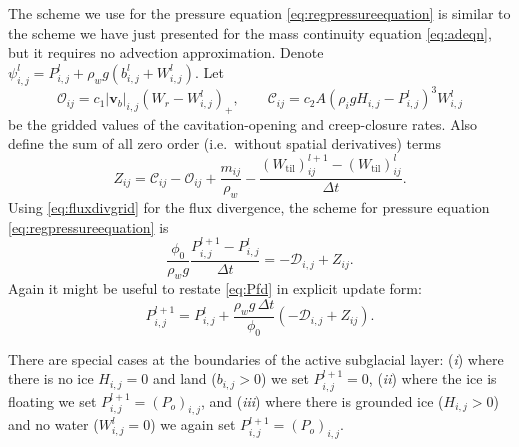 \documentclass[11pt,final]{amsart}
\newcommand\bv{\mathbf{v}}
\newcommand{\Wtil}{W_{\text{til}}}
\newcommand{\Wlij}{W^l_{i,j}}
\newcommand{\Plij}{P^l_{i,j}}
\begin{document}
The scheme we use for the pressure equation \eqref{eq:regpressureequation} is similar to the scheme we have just presented for the mass continuity equation \eqref{eq:adeqn}, but it requires no advection approximation.  Denote $\psi_{i,j}^l = P_{i,j}^l + \rho_w g (b_{i,j}^l + W_{i,j}^l)$.  Let
	$$\mathcal{O}_{ij} = c_1 |\bv_b|_{i,j} \left(W_r - \Wlij\right)_+, \qquad \mathcal{C}_{ij} = c_2 A \left(\rho_i g H_{i,j} - \Plij\right)^3 \Wlij$$
be the gridded values of the cavitation-opening and creep-closure rates.  Also define the sum of all zero order (i.e.~without spatial derivatives) terms
    $$Z_{ij} = \mathcal{C}_{ij} - \mathcal{O}_{ij} + \frac{m_{ij}}{\rho_w} - \frac{(\Wtil)_{ij}^{l+1} - (\Wtil)_{ij}^l}{\Delta t}.$$
Using \eqref{eq:fluxdivgrid} for the flux divergence, the scheme for pressure equation \eqref{eq:regpressureequation} is
\begin{equation}
\frac{\phi_0}{\rho_w g} \frac{P_{i,j}^{l+1} - \Plij}{\Delta t} = - \mathcal{D}_{i,j} + Z_{ij}.  \label{eq:Pfd}
\end{equation}
Again it might be useful to restate \eqref{eq:Pfd} in explicit update form:
\begin{equation}
P_{i,j}^{l+1} = \Plij + \frac{\rho_w g\,\Delta t}{\phi_0} \left(- \mathcal{D}_{i,j} + Z_{ij}\right). \label{eq:Pfdupdate}
\end{equation}

There are special cases at the boundaries of the active subglacial layer: (\emph{i}) where there is no ice $H_{i,j}=0$ and land ($b_{i,j}>0$) we set $P_{i,j}^{l+1}=0$, (\emph{ii}) where the ice is floating we set $P_{i,j}^{l+1}=(P_o)_{i,j}$, and (\emph{iii}) where there is grounded ice ($H_{i,j}>0$) and no water ($W_{i,j}^l=0$) we again set $P_{i,j}^{l+1}=(P_o)_{i,j}$. 
\end{document}
